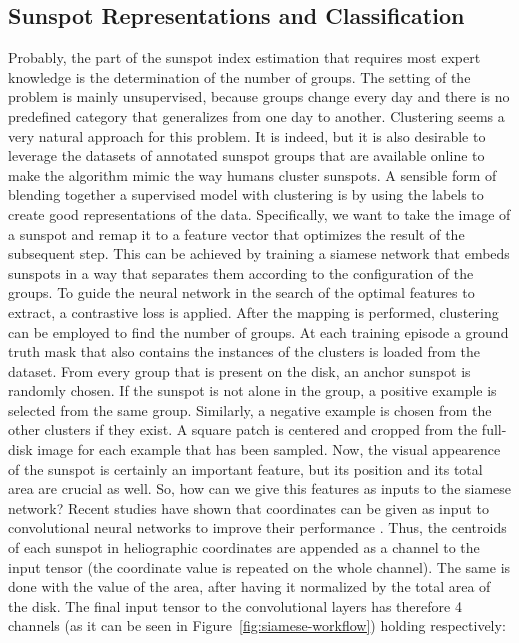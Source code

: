 \subsection{Sunspot Representations and Classification}
Probably, the part of the sunspot index estimation that requires most expert knowledge is the determination of the number of groups. The setting of the problem is mainly unsupervised, because groups change every day and there is no predefined category that generalizes from one day to another.
\bigbreak
\noindent  Clustering seems a very natural approach for this problem. It is indeed, but it is also desirable to leverage the datasets of annotated sunspot groups that are available online to make the algorithm mimic the way humans cluster sunspots. A sensible form of blending together a supervised model with clustering is by using the labels to create good representations of the data. Specifically, we want to take the image of a sunspot and remap it to a feature vector that optimizes the result of the subsequent step. This can be achieved by training a siamese network that embeds sunspots in a way that separates them according to the configuration of the groups. To guide the neural network in the search of the optimal features to extract, a contrastive loss is applied. After the mapping is performed, clustering can be employed to find the number of groups.
\bigbreak
\noindent At each training episode a ground truth mask that also contains the instances of the clusters is loaded from the dataset. From every group that is present on the disk, an anchor sunspot is randomly chosen. If the sunspot is not alone in the group, a positive example is selected from the same group. Similarly, a negative example is chosen from the other clusters if they exist. A square patch is centered and cropped from the full-disk image for each example that has been sampled. Now, the visual appearence of the sunspot is certainly an important feature, but its position and its total area are crucial as well. So, how can we give this features as inputs to the siamese network? Recent studies have shown that coordinates can be given as input to convolutional neural networks to improve their performance \cite{liu2018intriguing}. Thus, the centroids of each sunspot in heliographic coordinates are appended as a channel to the input tensor (the coordinate value is repeated on the whole channel). The same is done with the value of the area, after having it normalized by the total area of the disk. The final input tensor to the convolutional layers has therefore 4 channels (as it can be seen in Figure~\ref{fig:siamese-workflow}) holding respectively:
